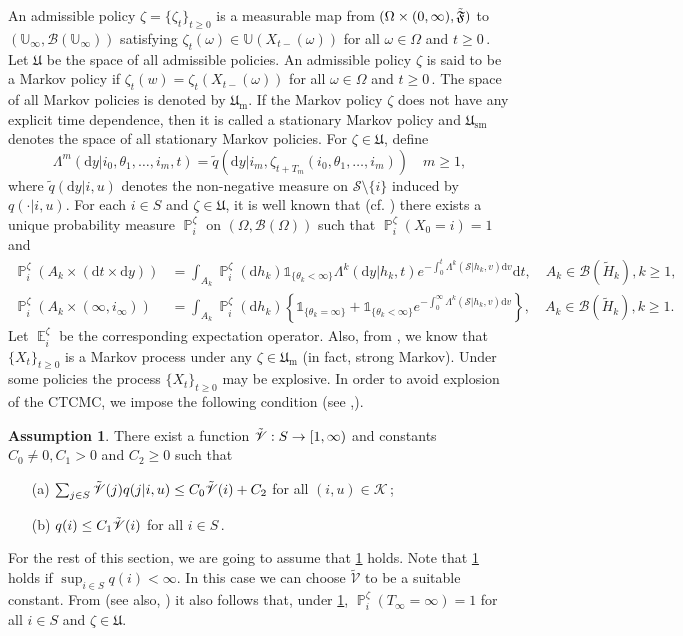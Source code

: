 \documentclass[notitlepage,11pt,reqno]{amsart}
\numberwithin{equation}{section}
\theoremstyle{plain}
\theoremstyle{definition}
\newtheorem{assumption}{Assumption}[section]
\theoremstyle{remark}
\newcommand{\Ind}{\mathds{1}}       %
\newcommand{\Act}{{\mathds{U}}}
\newcommand{\sB}{{\mathscr{B}}}
\newcommand{\sK}{{\mathscr{K}}}
\newcommand{\cS}{{\mathcal{S}}}     %
\newcommand{\Lyap}{{\mathscr{V}}}   %
\newcommand{\Uadm}{\mathfrak{U}}
\newcommand{\Um}{\mathfrak{U}_{\mathrm{m}}}
\newcommand{\Usm}{\mathfrak{U}_{\mathrm{sm}}}
\DeclareMathOperator{\Exp}{\mathbb{E}} %
\DeclareMathOperator{\Prob}{\mathbb{P}} %
\newcommand{\D}{\mathrm{d}} %
\begin{document}
An admissible policy $\zeta = \{\zeta_t\}_{t\ge 0}$ is a measurable map from $(\Omega\times (0,\infty), \Tilde{\mathfrak{F}})$ to $(\Act_{\infty}, \sB(\Act_{\infty}))$ satisfying
$\zeta_t(\omega)\in\Act(X_{t-}(\omega))$ for all $\omega\in\Omega$ and $t\ge 0$\,. Let $\Uadm$ be the space of all admissible policies. An admissible policy $\zeta$ is said to be a Markov policy if $\zeta_t(w) = \zeta_{t}(X_{t-}(\omega))$ for all $\omega\in\Omega$ and $t\ge 0$\,. The space of all Markov policies is denoted by $\Um$. If the Markov policy $\zeta$ does not have any explicit time dependence, then it is called a stationary Markov policy and $\Usm$ denotes the space of all stationary Markov policies. For $\zeta\in\Uadm$, define
$$\Lambda^m(\D{y}|i_0, \theta_1, \ldots, i_{m}, t)= \tilde{q}(\D{y}|i_m, \zeta_{t+T_m}(i_0, \theta_1, \ldots, i_{m}))\quad m\geq 1,$$
where $\tilde{q}(\D{y}|i, u)$ denotes the non-negative measure on $\cS\setminus\{i\}$ induced by $q(\cdot|i, u)$.
For each $i\in S$ and $\zeta\in \Uadm$, it is well known that (cf.
\cite{K85,GL19,GZ19,MR3175209}) there exists a unique probability measure $\Prob_{i}^{\zeta}$ on $(\Omega, \sB(\Omega))$ such that $\Prob_{i}^{\zeta}(X_0 = i) = 1$ and
\begin{align*}
\Prob_i^\zeta(A_k\times(\D{t}\times\D{y})) &=\int_{A_k} \Prob_{i}^{\zeta}(\D{h}_k) \Ind_{\{\theta_k<\infty\}} \Lambda^k(\D{y}|h_k, t) e^{-\int_0^t \Lambda^k(\cS|h_k, v)\D{v}} \D{t}, \quad A_k\in \sB(\tilde{H}_k), k\geq 1,
\\
\Prob_i^\zeta(A_k\times(\infty, i_\infty)) &=\int_{A_k} \Prob_{i}^{\zeta}(\D{h}_k)\left\{\Ind_{\{\theta_k=\infty\}}+ \Ind_{\{\theta_k<\infty\}}  e^{-\int_0^\infty \Lambda^k(\cS|h_k, v)\D{v}} \right\}, \quad A_k\in \sB(\tilde{H}_k), k\geq 1.
\end{align*}
 Let $\Exp_i^{\zeta}$ be the corresponding expectation operator. Also, from \cite[pp.13-15]{GHL09}, we know that $\{X_t\}_{t\ge 0}$ is a Markov process under any $\zeta\in\Um$ (in fact, strong Markov). 
Under some policies the process $\{X_t\}_{t\ge 0}$ may be explosive. In order to avoid explosion of the CTCMC, we impose the following condition (see \cite{GL19,GZ19},\cite[Assumption~2.2]{GHL09}).
\begin{assumption}\label{A4.2}
There exist a function $\Tilde{\Lyap}: S \to [1,\infty)$ and constants $C_0\neq 0, C_1>0$ and $C_2\ge 0$ such that
\begin{itemize}
\item[(a)] $\sum_{j\in S} \Tilde{\Lyap}(j)q(j|i,u) \le C_0\Tilde{\Lyap}(i) + C_{2}$ for all $(i, u)\in \sK$\,;
\item[(b)] $q(i) \le C_1 \Tilde{\Lyap}(i)$ for all $i\in S$\,.
\end{itemize} 
\end{assumption}
For the rest of this section, we are going to assume that \cref{A4.2} holds. Note that
\cref{A4.2} holds if $\sup_{i\in S} q(i)<\infty$. In this case we can choose $\tilde{\Lyap}$ to
be a suitable constant.
 From \cite[Theorem~3.1]{GP11} (see also, \cite[Proposition~2.2]{GL19}) it also
follows that, under \cref{A4.2}, $\Prob^\zeta_i (T_\infty=\infty)=1$ for all $i\in S$ and $\zeta\in \Uadm$.
 
\end{document}
